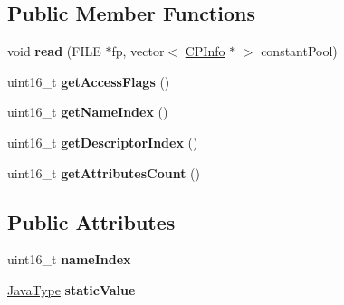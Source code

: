 \subsection*{Public Member Functions}
\begin{DoxyCompactItemize}
\item 
void {\bfseries read} (F\+I\+LE $\ast$fp, vector$<$ \hyperlink{classCPInfo}{C\+P\+Info} $\ast$ $>$ constant\+Pool)\hypertarget{classFieldInfo_ac28def66447b6ba142a7d1036b13f78f}{}\label{classFieldInfo_ac28def66447b6ba142a7d1036b13f78f}

\item 
uint16\+\_\+t {\bfseries get\+Access\+Flags} ()\hypertarget{classFieldInfo_a8f6bd79873bbf80215831234c16d03c0}{}\label{classFieldInfo_a8f6bd79873bbf80215831234c16d03c0}

\item 
uint16\+\_\+t {\bfseries get\+Name\+Index} ()\hypertarget{classFieldInfo_af0f0b36991366dabb9899799891c98e1}{}\label{classFieldInfo_af0f0b36991366dabb9899799891c98e1}

\item 
uint16\+\_\+t {\bfseries get\+Descriptor\+Index} ()\hypertarget{classFieldInfo_a48dba1ad239aa8577fbbb9b93db9d127}{}\label{classFieldInfo_a48dba1ad239aa8577fbbb9b93db9d127}

\item 
uint16\+\_\+t {\bfseries get\+Attributes\+Count} ()\hypertarget{classFieldInfo_a7a13cc4838d95f9564d7e32b8af3c452}{}\label{classFieldInfo_a7a13cc4838d95f9564d7e32b8af3c452}

\end{DoxyCompactItemize}
\subsection*{Public Attributes}
\begin{DoxyCompactItemize}
\item 
uint16\+\_\+t {\bfseries name\+Index}\hypertarget{classFieldInfo_a88ea5c29063df8933d5277e846924b1e}{}\label{classFieldInfo_a88ea5c29063df8933d5277e846924b1e}

\item 
\hyperlink{structJavaType}{Java\+Type} {\bfseries static\+Value}\hypertarget{classFieldInfo_a3dad438d44c59fc319d708c6909c1807}{}\label{classFieldInfo_a3dad438d44c59fc319d708c6909c1807}

\end{DoxyCompactItemize}
